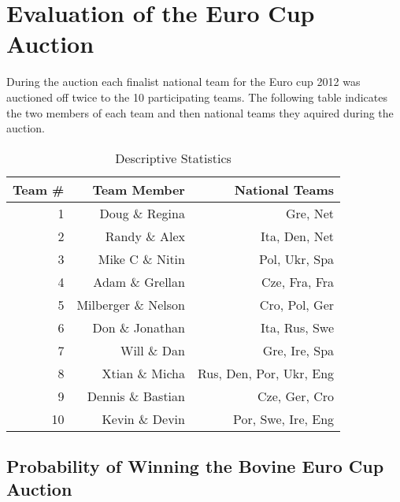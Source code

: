 \documentclass{article}\usepackage[]{graphicx}\usepackage[]{color}
\begin{document}
\newpage
\section{Evaluation of the Euro Cup Auction}  %

During the auction each finalist national team for the Euro cup 2012 was auctioned off twice to the 10 participating teams. The following table indicates the two members of each team and then national teams they aquired during the auction.

\vspace{10mm}

\begin{table}[ht]
\begin{center}
{\small
\begin{tabular}{rrr}
  \hline
  Team \# & Team Member & National Teams \\ 
  \hline 
1 & Doug \& Regina & Gre, Net \\
2 & Randy \& Alex & Ita, Den, Net \\
3 & Mike C \& Nitin & Pol, Ukr, Spa \\
4 & Adam \& Grellan & Cze, Fra, Fra \\
5 & Milberger \& Nelson & Cro, Pol, Ger \\
6 & Don \& Jonathan & Ita, Rus, Swe \\
7 & Will \& Dan & Gre, Ire, Spa \\
8 & Xtian \& Micha & Rus, Den, Por, Ukr, Eng \\
9 & Dennis \& Bastian & Cze, Ger, Cro \\
10 & Kevin \& Devin & Por, Swe, Ire, Eng \\
   \hline
\end{tabular}
}
\caption{Descriptive Statistics}
\end{center}
\end{table}



\subsection{Probability of Winning the Bovine Euro Cup Auction\texttrademark}
\end{document}
